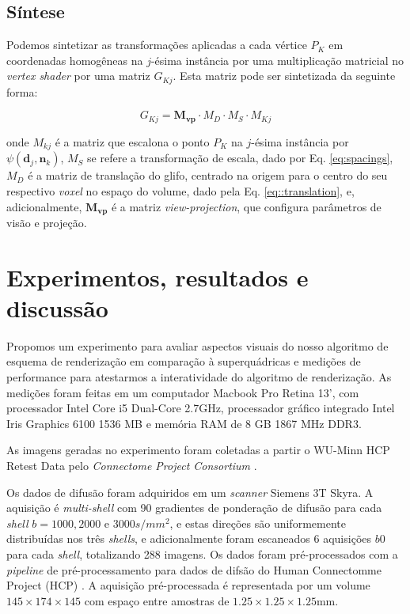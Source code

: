 \documentclass[
    12pt,                %
    oneside,            %
    a4paper,            %
    english,            %
    french,                %
    spanish,            %
    brazil                %
    ]{abntex2}
\begin{document}
\subsection{Síntese}

Podemos sintetizar as transformações aplicadas a cada vértice $P_K$ em coordenadas homogêneas na $j$-ésima instância por uma multiplicação matricial no \textit{vertex shader} por uma matriz $G_{Kj}$. Esta matriz pode ser sintetizada da seguinte forma:

\begin{equation}
    G_{Kj} = \mathbf{M_{vp}}\cdot M_D \cdot M_S \cdot M_{Kj}
\end{equation}

onde $M_{kj}$ é a matriz que escalona o ponto $P_K$ na $j$-ésima instância por $\psi(\mathbf{d}_j, \mathbf{n}_k)$, $M_S$ se refere a transformação de escala, dado por Eq. \ref{eq:spacings}, $M_D$ é a matriz de translação do glifo, centrado na origem para o centro do seu respectivo \textit{voxel} no espaço do volume, dado pela Eq. \ref{eq::translation}, e, adicionalmente, $\mathbf{M_{vp}}$ é a matriz \textit{view-projection}, que configura parâmetros de visão e projeção.

\section{Experimentos, resultados e discussão}
\label{sec::experimentos}

Propomos um experimento para avaliar aspectos visuais do nosso algoritmo de esquema de renderização em comparação à superquádricas e medições de performance para atestarmos a interatividade do algoritmo de renderização. As medições foram feitas em um computador Macbook Pro Retina 13', com processador Intel Core i5 Dual-Core 2.7GHz, processador gráfico integrado Intel Iris Graphics 6100 1536 MB e memória RAM de 8 GB 1867 MHz DDR3.

As imagens geradas no experimento foram coletadas a partir o WU-Minn HCP Retest Data pelo \textit{Connectome Project Consortium} \cite{essen2012}.

Os dados de difusão foram adquiridos em um \textit{scanner} Siemens 3T Skyra. A aquisição é \textit{multi-shell} com 90 gradientes de ponderação de difusão para cada \textit{shell} $b = 1000, 2000$ e $3000 s/mm^2$, e estas direções são uniformemente distribuídas nos três \textit{shells}, e adicionalmente foram escaneados 6 aquisições $b0$ para cada \textit{shell}, totalizando 288 imagens. Os dados foram pré-processados com a \textit{pipeline} de pré-processamento para dados de difsão do Human Connectomme Project (HCP) \cite{glasser2013}. A aquisição pré-processada é representada por um volume $145\times 174\times  145$ com espaço entre amostras de $1.25\times 1.25 \times 1.25$mm.
\end{document}
